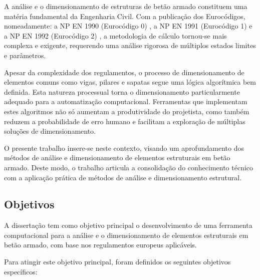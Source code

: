 A análise e o dimensionamento de estruturas de betão armado constituem uma matéria fundamental da Engenharia Civil. Com a publicação dos Eurocódigos, nomeadamente: a NP EN 1990 (Eurocódigo 0) \cite{EN1990}, a NP EN 1991 (Eurocódigo 1) \cite{EN1991} e a NP EN 1992 (Eurocódigo 2) \cite{EN1992}, a metodologia de cálculo tornou-se mais complexa e exigente, requerendo uma análise rigorosa de múltiplos estados limites e parâmetros.

Apesar da complexidade dos regulamentos, o processo de dimensionamento de elementos comuns como vigas, pilares e sapatas segue uma lógica algorítmica bem definida. Esta natureza processual torna o dimensionamento particularmente adequado para a automatização computacional. Ferramentas que implementam estes algoritmos não só aumentam a produtividade do projetista, como também reduzem a probabilidade de erro humano e facilitam a exploração de múltiplas soluções de dimensionamento.

O presente trabalho insere-se neste contexto, visando um aprofundamento dos métodos de análise e dimensionamento de elementos estruturais em betão armado. Deste modo, o trabalho articula a consolidação do conhecimento técnico com a aplicação prática de métodos de análise e dimensionamento estrutural.
\subsection{Objetivos}
A dissertação tem como objetivo principal o desenvolvimento de uma ferramenta computacional para a análise e o dimensionamento de elementos estruturais em betão armado, com base nos regulamentos europeus aplicáveis.

Para atingir este objetivo principal, foram definidos os seguintes objetivos específicos:

